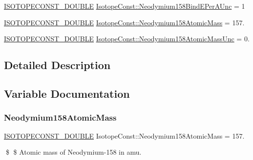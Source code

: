 \begin{DoxyCompactItemize}
\mbox{\hyperlink{group___isotope_const-_macros_ga8f45a7272ce02c0b4c65c44636ed719a}{I\+S\+O\+T\+O\+P\+E\+C\+O\+N\+S\+T\+\_\+\+D\+O\+U\+B\+LE}} \mbox{\hyperlink{group___isotope_const-_neodymium-_nd158_ga299c0ef51ec630ec77900ef4e9251080}{Isotope\+Const\+::\+Neodymium158\+Bind\+E\+Per\+A\+Unc}} = 1
\item 
\mbox{\hyperlink{group___isotope_const-_macros_ga8f45a7272ce02c0b4c65c44636ed719a}{I\+S\+O\+T\+O\+P\+E\+C\+O\+N\+S\+T\+\_\+\+D\+O\+U\+B\+LE}} \mbox{\hyperlink{group___isotope_const-_neodymium-_nd158_ga18bc3c909e8edbd6f2ccf43e07f4062b}{Isotope\+Const\+::\+Neodymium158\+Atomic\+Mass}} = 157.
\item 
\mbox{\hyperlink{group___isotope_const-_macros_ga8f45a7272ce02c0b4c65c44636ed719a}{I\+S\+O\+T\+O\+P\+E\+C\+O\+N\+S\+T\+\_\+\+D\+O\+U\+B\+LE}} \mbox{\hyperlink{group___isotope_const-_neodymium-_nd158_gafdd1d023e9ecdb90b106801288817b51}{Isotope\+Const\+::\+Neodymium158\+Atomic\+Mass\+Unc}} = 0.
\end{DoxyCompactItemize}


\subsection{Detailed Description}


\subsection{Variable Documentation}
\mbox{\label{group___isotope_const-_neodymium-_nd158_ga18bc3c909e8edbd6f2ccf43e07f4062b}} 
\subsubsection{\texorpdfstring{Neodymium158\+Atomic\+Mass}{Neodymium158AtomicMass}}
{\footnotesize\ttfamily \mbox{\hyperlink{group___isotope_const-_macros_ga8f45a7272ce02c0b4c65c44636ed719a}{I\+S\+O\+T\+O\+P\+E\+C\+O\+N\+S\+T\+\_\+\+D\+O\+U\+B\+LE}} Isotope\+Const\+::\+Neodymium158\+Atomic\+Mass = 157.}

\$ \$ Atomic mass of Neodymium-\/158 in amu. \mbox{\label{group___isotope_const-_neodymium-_nd158_gafdd1d023e9ecdb90b106801288817b51}} 
